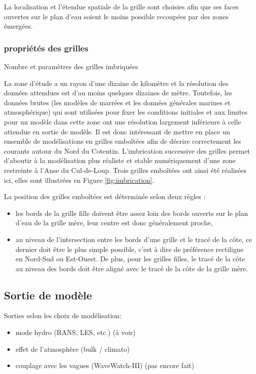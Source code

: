 \documentclass[10pt,a4paper,titlepage]{article}
\begin{document}
La localisation et l'étendue spatiale de la grille sont choisies afin que ses faces ouvertes sur le plan d'eau soient le moins possible recoupées par des zones émergées.

\subsubsection{propriétés des grilles}
\label{subsub:propriete_gilles_ADCL}
{\color{lightgrey}
    Nombre et paramètres des grilles imbriquées
}

La zone d'étude a un rayon d'une dizaine de kilomètre et la résolution des données attendues est d'au moins quelques dizaines de mètre.
Toutefois, les données brutes (les modèles de marrées et les données générales marines et atmosphérique) qui sont utilisées pour fixer les conditions initiales et aux limites pour un modèle dans cette zone ont une résolution largement inférieure à celle attendue en sortie de modèle.
Il est donc intéressant de mettre en place un ensemble de modélisations en grilles emboîtées afin de décrire correctement les courants autour du Nord du Cotentin.
L'imbrication successive des grilles permet d'aboutir à la modélisation plus réaliste et stable numériquement d'une zone restreinte à l'Anse du Cul-de-Loup.
Trois grilles emboîtées ont ainsi été réalisées ici, elles sont illustrées en Figure \ref{fig:imbrication}.


La position des grilles emboîtées est déterminée selon deux règles :
\begin{itemize}
    \item les bords de la grille fille doivent être assez loin des bords ouverts sur le plan d'eau de la grille mère, leur centre est donc généralement proche,
    \item au niveau de l'intersection entre les bords d'une grille et le tracé de la côte, ce dernier doit être le plus simple possible, c'est à dire de préférence rectiligne en Nord-Sud ou Est-Ouest.
    De plus, pour les grilles filles, le tracé de la côte au niveau des bords doit être aligné avec le tracé de la côte de la grille mère.
\end{itemize}

\subsection{Sortie de modèle}
\label{sub:sortie_modele}
Sorties selon les choix de modélisation:
\begin{itemize}
    \item mode hydro (RANS, LES, etc.) (à voir)
    \item effet de l'atmosphère (bulk / climato)
    \item couplage avec les vagues (WaveWatch-III) (pas encore fait)
\end{itemize}
\end{document}
